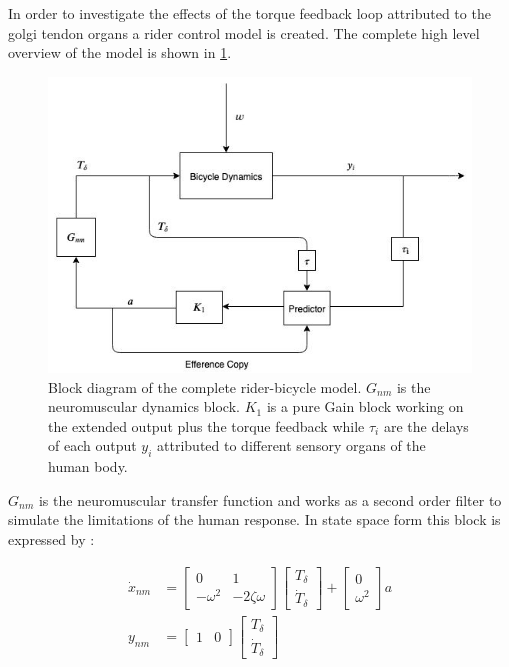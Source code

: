 In order to investigate the effects of the torque feedback loop attributed to the golgi tendon organs a rider control model is created. The complete high level overview of the model is shown in \cref{fig:paper3}.
\begin{figure}[ht]
    \centering
    \captionsetup{justification=centering,margin=2cm}

    \includegraphics[scale=0.6]{images/rider_block_overview.jpg}
    \caption{Block diagram of the complete rider-bicycle model. \ensuremath{G_{nm}} is the neuromuscular dynamics block. \ensuremath{K_1} is a pure Gain block working on the extended output plus the torque feedback   while \ensuremath{\tau_i} are the delays of each output \ensuremath{y_i} attributed to different sensory organs of the human body. } 
    \label{fig:paper3}
\end{figure}

\ensuremath{G_{nm}} is the neuromuscular transfer function and works as a second order filter to simulate the limitations of the human response. In state space form this block is expressed by :

\begin{align}
\dot{x}_{nm} &= \begin{bmatrix}0 & 1 \\ -\omega^2 & -2\zeta\omega\end{bmatrix} \begin{bmatrix} T_\delta \\ \dot{T}_\delta\end{bmatrix} + \begin{bmatrix} 0 \\ \omega^2\end{bmatrix} a \\
    y_{nm} &= \begin{bmatrix}1 & 0\end{bmatrix} \begin{bmatrix} T_\delta \\ \dot{T}_\delta\end{bmatrix}
        \label{eq:gnmBLOCK}
\end{align}

